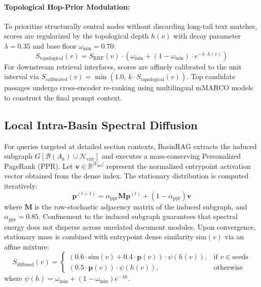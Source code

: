 \documentclass[10pt,twocolumn]{article}
\theoremstyle{definition}
\begin{document}
\paragraph{Topological Hop-Prior Modulation:}
To prioritize structurally central nodes without discarding long-tail text matches, scores are regularized by the topological depth $h(v)$ with decay parameter $\lambda = 0.35$ and base floor $\omega_{\min} = 0.70$:
\begin{equation}
S_{\text{topological}}(v) = S_{\text{RRF}}(v) \cdot \left( \omega_{\min} + (1 - \omega_{\min}) \cdot e^{-\lambda \cdot h(v)} \right)
\end{equation}
For downstream retrieval interfaces, scores are affinely calibrated to the unit interval via $S_{\text{calibrated}}(v) = \min(1.0, \, k \cdot S_{\text{topological}}(v))$. Top candidate passages undergo cross-encoder re-ranking using multilingual mMARCO models to construct the final prompt context.

\subsection{Local Intra-Basin Spectral Diffusion}

For queries targeted at detailed section contexts, BasinRAG extracts the induced subgraph $G[\mathcal{B}(A_k) \cup \mathcal{N}_{\text{virt}}]$ and executes a mass-conserving Personalized PageRank (PPR). Let $\mathbf{v} \in \mathbb{R}^{|V_{\text{ind}}|}$ represent the normalized entrypoint activation vector obtained from the dense index. The stationary distribution is computed iteratively:
\begin{equation}
\mathbf{p}^{(t+1)} = \alpha_{\text{ppr}} \mathbf{M} \mathbf{p}^{(t)} + (1 - \alpha_{\text{ppr}}) \mathbf{v}
\end{equation}
where $\mathbf{M}$ is the row-stochastic adjacency matrix of the induced subgraph, and $\alpha_{\text{ppr}} = 0.85$. Confinement to the induced subgraph guarantees that spectral energy does not disperse across unrelated document modules. Upon convergence, stationary mass is combined with entrypoint dense similarity $\text{sim}(v)$ via an affine mixture:
\begin{equation}
S_{\text{diffused}}(v) = \begin{cases}
(0.6 \cdot \text{sim}(v) + 0.4 \cdot \mathbf{p}(v)) \cdot \psi(h(v)), & \text{if } v \in \text{seeds} \\
(0.5 \cdot \mathbf{p}(v)) \cdot \psi(h(v)), & \text{otherwise}
\end{cases}
\end{equation}
where $\psi(h) = \omega_{\min} + (1 - \omega_{\min}) e^{-\lambda h}$.
\end{document}
